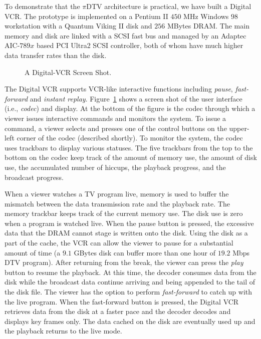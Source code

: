 
To demonstrate that the $\pi$DTV architecture is practical,
we have built a Digital VCR.
The prototype is implemented on a Pentium II
$450$ MHz Windows $98$ workstation with a Quantum Viking II disk
and $256$ MBytes DRAM.  The main memory and disk are linked
with a SCSI fast bus and managed by an Adaptec AIC-$789x$ based
PCI Ultra2 SCSI controller, both of whom
have much higher data transfer
rates than the disk.           

\begin{figure}[t]
\centerline{}
\caption{A Digital-VCR Screen Shot.}
\label{fig-codec}
\end{figure}
              
The Digital VCR supports VCR-like interactive functions including
{\em pause}, {\em fast-forward} and {\em instant replay}.
Figure~\ref{fig-codec} shows a screen shot of the user interface
(i.e., {\em codec}) and display. 
At the bottom of the figure is the codec through which a viewer
issues interactive commands and monitors the system.
To issue a command, a viewer selects and presses one
of the control buttons on the upper-left corner of
the codec (described shortly). To monitor the system, the 
codec uses trackbars to display various statuses. The five 
trackbars from the top to the bottom on the codec keep track
of the amount of memory use, the amount of disk use,
the accumulated number of hiccups, the playback progress,
and the broadcast progress.

When a viewer watches a TV program live, memory is
used to buffer the mismatch between the data transmission 
rate and the playback rate. The memory trackbar keeps
track of the current memory use. The disk use
is zero when a program is watched live. When the pause button
is pressed, the excessive data that the DRAM cannot stage is
written onto the disk. Using the disk as a part of the
cache, the VCR can allow the viewer to pause for a substantial amount 
of time (a $9.1$ GBytes disk can buffer more than one hour of
$19.2$ Mbps DTV program).  After returning from the break, the viewer
can press the {\em play} button to resume the playback. At
this time, the decoder consumes data from the disk while the
broadcast data continue arriving and being appended to
the tail of the disk file. The viewer has the option to
perform {\em fast-forward} to catch up with the live 
program. When the fast-forward button is pressed, the Digital VCR
retrieves data from the disk at a faster pace and the decoder
decodes and displays key frames only. The data cached on the disk are
eventually used up and the playback returns to the
live mode. 

